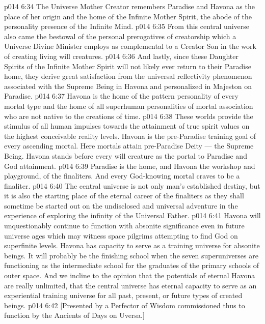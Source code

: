\vs p014 6:34 The Universe Mother Creator remembers Paradise and Havona as the place of her origin and the home of the Infinite Mother Spirit, the abode of the personality presence of the Infinite Mind.
\vs p014 6:35 From this central universe also came the bestowal of the personal prerogatives of creatorship which a Universe Divine Minister employs as complemental to a Creator Son in the work of creating living will creatures.
\vs p014 6:36 And lastly, since these Daughter Spirits of the Infinite Mother Spirit will not likely ever return to their Paradise home, they derive great satisfaction from the universal reflectivity phenomenon associated with the Supreme Being in Havona and personalized in Majeston on Paradise.
\vs p014 6:37 \bibnobreakspace {} Havona is the home of the pattern personality of every mortal type and the home of all superhuman personalities of mortal association who are not native to the creations of time.
\vs p014 6:38 These worlds provide the stimulus of all human impulses towards the attainment of true spirit values on the highest conceivable reality levels. Havona is the pre\hyp{}Paradise training goal of every ascending mortal. Here mortals attain pre\hyp{}Paradise Deity --- the Supreme Being. Havona stands before every will creature as the portal to Paradise and God attainment.
\vs p014 6:39 Paradise is the home, and Havona the workshop and playground, of the finaliters. And every God\hyp{}knowing mortal craves to be a finaliter.
\vs p014 6:40 The central universe is not only man’s established destiny, but it is also the starting place of the eternal career of the finaliters as they shall sometime be started out on the undisclosed and universal adventure in the experience of exploring the infinity of the Universal Father.
\vs p014 6:41 \pc Havona will unquestionably continue to function with absonite significance even in future universe ages which may witness space pilgrims attempting to find God on superfinite levels. Havona has capacity to serve as a training universe for absonite beings. It will probably be the finishing school when the seven superuniverses are functioning as the intermediate school for the graduates of the primary schools of outer space. And we incline to the opinion that the potentials of eternal Havona are really unlimited, that the central universe has eternal capacity to serve as an experiential training universe for all past, present, or future types of created beings.
\vsetoff
\vs p014 6:42 [Presented by a Perfector of Wisdom commissioned thus to function by the Ancients of Days on Uversa.]
\quizlink
